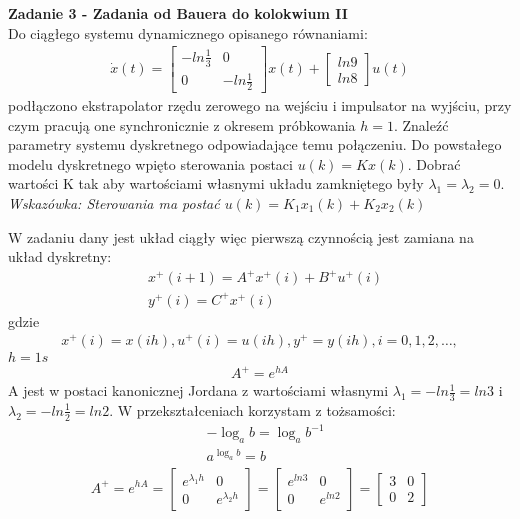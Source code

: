 \documentclass[a4paper,11pt]{article}
\begin{document}
 
\newpage
\begin{framed}
\textbf{Zadanie 3 - Zadania od Bauera do kolokwium II } \\ 
Do ciągłego systemu dynamicznego opisanego równaniami: 
\begin{align*}
\dot{x}(t) =
\begin{bmatrix}
-ln\frac{1}{3} & 0 \\
0 & -ln\frac{1}{2}
\end{bmatrix}
x(t)+
\begin{bmatrix}
ln9 \\
ln 8
\end{bmatrix}
u(t)
\end{align*}
podłączono ekstrapolator rzędu zerowego na wejściu i impulsator na wyjściu, przy czym pracują one synchronicznie z okresem próbkowania \( h = 1 \). Znaleźć parametry systemu dyskretnego odpowiadające temu połączeniu. Do powstałego modelu dyskretnego wpięto sterowania postaci \( u(k)= Kx(k) \). Dobrać wartości K tak aby wartościami własnymi układu zamkniętego były \( \lambda_{1} = \lambda_{2} = 0 \). \\ 
\textit{Wskazówka: Sterowania ma postać \( u(k) = K_{1}x_{1}(k)+K_{2}x_{2}(k)\)}
\end{framed}
W zadaniu dany jest układ ciągły więc pierwszą czynnością jest zamiana na układ dyskretny: \\
\begin{align*}
&x^{+}(i+1)=A^{+}x^{+}(i)+B^{+}u^{+}(i) \\
&y^{+}(i)=C^{+}x^{+}(i)
\end{align*}
gdzie 
\begin{align*}
x^{+}(i)=x(ih), u^{+}(i)=u(ih), y^{+}=y(ih), i=0,1,2, \dots ,
\end{align*}
\( h = 1s \)
\begin{align*}
A^{+}=e^{hA}
\end{align*}
A jest w postaci kanonicznej Jordana z wartościami własnymi \( \lambda_{1} = -ln\frac{1}{3} = ln 3 \) i \( \lambda_{2} = -ln\frac{1}{2} = ln 2\). W przekształceniach korzystam z tożsamości:
\begin{align*}
&-\log_a b = \log_a b^{-1} \\
&a^{\log_a b} = b
\end{align*}
\begin{align*}
A^{+}=e^{hA}=
\begin{bmatrix}
e^{\lambda_{1}h} & 0 \\
0 & e^{\lambda_{2}h}
\end{bmatrix}
=
\begin{bmatrix}
e^{ln3} & 0 \\
0 & e^{ln2}
\end{bmatrix}
=
\begin{bmatrix}
3 & 0 \\
0 & 2
\end{bmatrix}
\end{align*}
\end{document}
